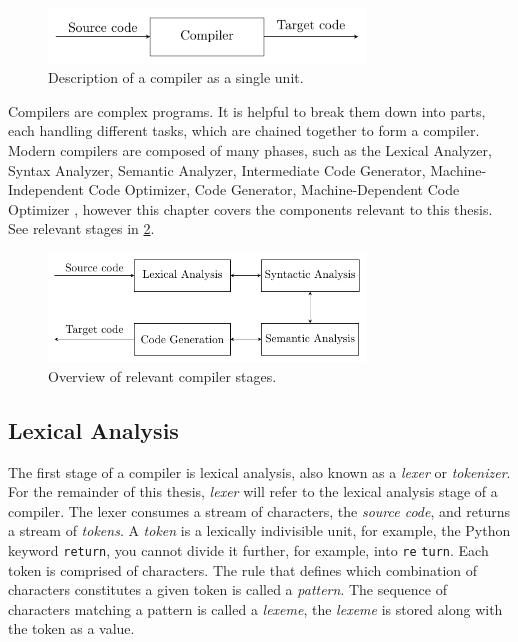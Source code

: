 \begin{figure}[h]
  \caption{Description of a compiler as a single unit.}
  \label{fig:compiler}
  \centering
  \includegraphics[width=0.75\textwidth]{figures/compiler.pdf}
\end{figure}



Compilers are complex programs. It is helpful to break them down into parts, each handling different tasks, which are chained together to form a compiler. Modern compilers are composed of many phases, such as the Lexical Analyzer, Syntax Analyzer, Semantic Analyzer, Intermediate Code Generator, Machine-Independent Code Optimizer, Code Generator, Machine-Dependent Code Optimizer \cite[p. 5]{dragon}, however this chapter covers the components relevant to this thesis. See relevant stages in \cref{fig:compiler-stages}.


\begin{figure}[h]
  \caption{Overview of relevant compiler stages.}
  \label{fig:compiler-stages}
  \centering
  \includegraphics[width=0.75\textwidth]{figures/compiler-stages.pdf}
\end{figure}

\subsection*{Lexical Analysis}
The first stage of a compiler is lexical analysis, also known as a \emph{lexer} or \emph{tokenizer}. For the remainder of this thesis, \emph{lexer} will refer to the lexical analysis stage of a compiler. The lexer consumes a stream of characters, the \emph{source code}, and returns a stream of \emph{tokens}. A \emph{token} is a lexically indivisible unit, for example, the Python keyword \texttt{return}, you cannot divide it further, for example, into \texttt{re} \texttt{turn}. Each token is comprised of characters. The rule that defines which combination of characters constitutes a given token is called a \emph{pattern}. The sequence of characters matching a pattern is called a \emph{lexeme}, the \emph{lexeme} is stored along with the token as a value.

